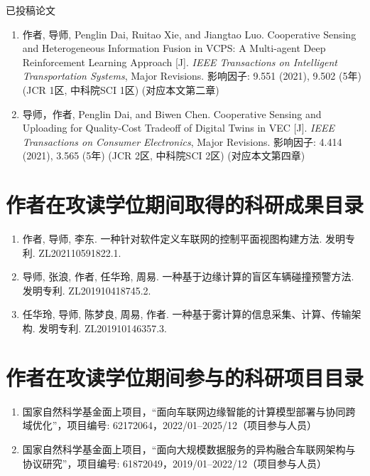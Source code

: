 已投稿论文

\begin{enumerate}
	\item 作者\textbf{}, 导师, Penglin Dai, Ruitao Xie, and Jiangtao Luo. Cooperative Sensing and Heterogeneous Information Fusion in VCPS: A Multi-agent Deep Reinforcement Learning Approach [J]. \textit{IEEE Transactions on Intelligent Transportation Systems}, Major Revisions. 影响因子: 9.551 (2021), 9.502 (5年) (JCR 1区, 中科院SCI 1区) (对应本文第二章)
	\item 导师，作者\textbf{}, Penglin Dai, and Biwen Chen. Cooperative Sensing and Uploading for Quality-Cost Tradeoff of Digital Twins in VEC [J]. \textit{IEEE Transactions on Consumer Electronics}, Major Revisions. 影响因子: 4.414 (2021), 3.565 (5年) (JCR 2区, 中科院SCI 2区) (对应本文第四章) 
\end{enumerate}

\section{作者在攻读学位期间取得的科研成果目录}
\begin{enumerate}
	\item 作者\textbf{}, 导师, 李东. 一种针对软件定义车联网的控制平面视图构建方法. 发明专利. ZL202110591822.1.
	\item 导师, 张浪, 作者\textbf{}, 任华玲, 周易. 一种基于边缘计算的盲区车辆碰撞预警方法. 发明专利. ZL201910418745.2.
	\item 任华玲, 导师, 陈梦良, 周易, 作者\textbf{}. 一种基于雾计算的信息采集、计算、传输架构. 发明专利. ZL201910146357.3.
\end{enumerate}

\section{作者在攻读学位期间参与的科研项目目录}
\begin{enumerate}
	\item 国家自然科学基金面上项目，“面向车联网边缘智能的计算模型部署与协同跨域优化”，项目编号: 62172064，2022/01–2025/12（项目参与人员）
	\item 国家自然科学基金面上项目，“面向大规模数据服务的异构融合车联网架构与协议研究”，项目编号: 61872049，2019/01–2022/12（项目参与人员）
\end{enumerate}

